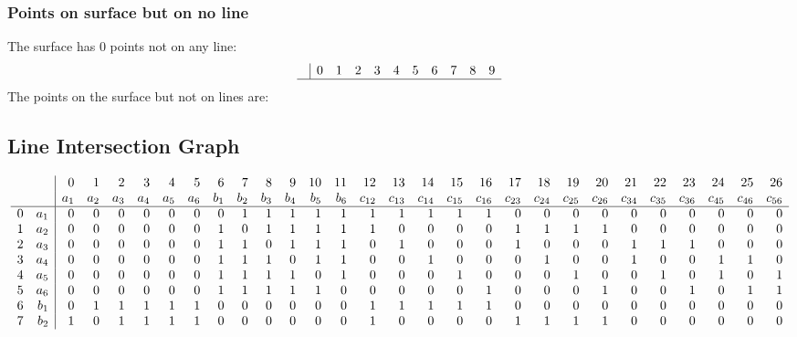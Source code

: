 \documentclass{article}
\begin{document}
{\subsubsection*{Points on surface but on no line}
The surface has 0 points not on any line:\\
$$
\begin{array}{r|*{10}{r}}
 & 0 & 1 & 2 & 3 & 4 & 5 & 6 & 7 & 8 & 9\\
\hline
\end{array}
$$
The points on the surface but not on lines are:\\
\begin{multicols}{2}
\noindent
\end{multicols}
\subsection*{Line Intersection Graph}
{\arraycolsep=1pt
$$
\begin{array}{rr|*{27}r}
 &  & 0 & 1 & 2 & 3 & 4 & 5 & 6 & 7 & 8 & 9 & 10 & 11 & 12 & 13 & 14 & 15 & 16 & 17 & 18 & 19 & 20 & 21 & 22 & 23 & 24 & 25 & 26\\
 &  & a_{1} & a_{2} & a_{3} & a_{4} & a_{5} & a_{6} & b_{1} & b_{2} & b_{3} & b_{4} & b_{5} & b_{6} & c_{12} & c_{13} & c_{14} & c_{15} & c_{16} & c_{23} & c_{24} & c_{25} & c_{26} & c_{34} & c_{35} & c_{36} & c_{45} & c_{46} & c_{56}\\
\hline
0 & a_{1} & 0 & 0 & 0 & 0 & 0 & 0 & 0 & 1 & 1 & 1 & 1 & 1 & 1 & 1 & 1 & 1 & 1 & 0 & 0 & 0 & 0 & 0 & 0 & 0 & 0 & 0 & 0\\
1 & a_{2} & 0 & 0 & 0 & 0 & 0 & 0 & 1 & 0 & 1 & 1 & 1 & 1 & 1 & 0 & 0 & 0 & 0 & 1 & 1 & 1 & 1 & 0 & 0 & 0 & 0 & 0 & 0\\
2 & a_{3} & 0 & 0 & 0 & 0 & 0 & 0 & 1 & 1 & 0 & 1 & 1 & 1 & 0 & 1 & 0 & 0 & 0 & 1 & 0 & 0 & 0 & 1 & 1 & 1 & 0 & 0 & 0\\
3 & a_{4} & 0 & 0 & 0 & 0 & 0 & 0 & 1 & 1 & 1 & 0 & 1 & 1 & 0 & 0 & 1 & 0 & 0 & 0 & 1 & 0 & 0 & 1 & 0 & 0 & 1 & 1 & 0\\
4 & a_{5} & 0 & 0 & 0 & 0 & 0 & 0 & 1 & 1 & 1 & 1 & 0 & 1 & 0 & 0 & 0 & 1 & 0 & 0 & 0 & 1 & 0 & 0 & 1 & 0 & 1 & 0 & 1\\
5 & a_{6} & 0 & 0 & 0 & 0 & 0 & 0 & 1 & 1 & 1 & 1 & 1 & 0 & 0 & 0 & 0 & 0 & 1 & 0 & 0 & 0 & 1 & 0 & 0 & 1 & 0 & 1 & 1\\
6 & b_{1} & 0 & 1 & 1 & 1 & 1 & 1 & 0 & 0 & 0 & 0 & 0 & 0 & 1 & 1 & 1 & 1 & 1 & 0 & 0 & 0 & 0 & 0 & 0 & 0 & 0 & 0 & 0\\
7 & b_{2} & 1 & 0 & 1 & 1 & 1 & 1 & 0 & 0 & 0 & 0 & 0 & 0 & 1 & 0 & 0 & 0 & 0 & 1 & 1 & 1 & 1 & 0 & 0 & 0 & 0 & 0 & 0\\

\end{array}$$}}
\end{document}
